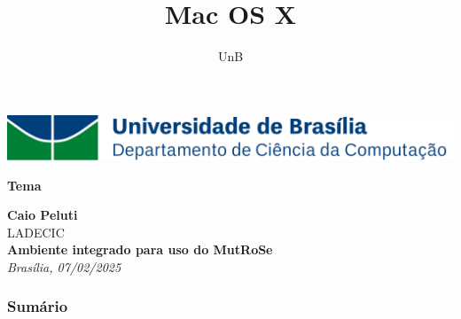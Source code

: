 \documentclass{beamer}
\title{Mac OS X} %
\author[Caio Peluti] %
{UnB\inst{1}}
\institute[CIC-UnB] %
\begin{document}



\begin{frame}[plain]{}
\begin{center}
\includegraphics[width=1.0\linewidth]{tipograma_CIC_4_alta.png} \hspace{0.2cm}\\
\vspace{0.75cm}
\begin{block}{ }
\begin{center}
\vspace{0.15cm}
\Large{ \textbf{Tema}}
\vspace{0.15cm}
\end{center}
\end{block}
\vspace{0.4cm}
\textbf{Caio Peluti}\\
{\small  LADECIC}\\
\vspace{0.4cm}
\textbf{Ambiente integrado para uso do MutRoSe}\\
\vspace{0.4cm}
{\it Brasília, 07/02/2025}\\
\vspace{0.25cm}
 \end{center}
\end{frame}

\begin{frame}
\frametitle{Sumário}
\tableofcontents
\end{frame}

\end{document}
